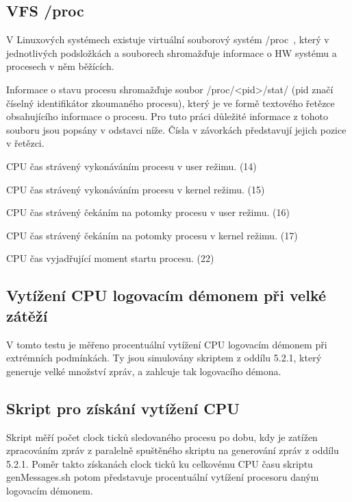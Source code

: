 \documentclass[thesis=B,czech]{FITthesis}[2012/06/26]
\begin{document}
\subsection{VFS /proc}
V Linuxových systémech existuje virtuální souborový systém /proc~\cite{procFilesystem}, který v jednotlivých podsložkách a souborech shromažďuje informace o HW systému a procesech v něm běžících.

Informace o stavu procesu shromažďuje soubor /proc/<pid>/stat/ (pid značí číselný identifikátor zkoumaného procesu), který je ve formě textového řetězce obsahujícího informace o procesu. Pro tuto práci důležité informace z tohoto souboru jsou popsány v odstavci níže. Čísla v závorkách představují jejich pozice v řetězci.

\begin{description}
\setlength\itemsep{-1ex}
	\item [utime:] CPU čas strávený vykonáváním procesu v user režimu. (14)
	\item [stime:] CPU čas strávený vykonáváním procesu v kernel režimu. (15)
	\item [cutime:] CPU čas strávený čekáním na potomky procesu v user režimu. (16)
	\item [cstime:] CPU čas strávený čekáním na potomky procesu v kernel režimu. (17)
	\item [starttime:] CPU čas vyjadřující moment startu procesu. (22)
\end{description}

\subsection{Vytížení CPU logovacím démonem při velké zátěží}
V tomto testu je měřeno procentuální vytížení CPU logovacím démonem při extrémních podmínkách. Ty jsou simulovány skriptem z oddílu 5.2.1, který generuje velké množství zpráv, a zahlcuje tak logovacího démona. 

\subsection*{Skript pro získání vytížení CPU}
Skript měří počet clock ticků sledovaného procesu po dobu, kdy je zatížen zpracováním zpráv z paralelně spuštěného skriptu na generování zpráv z oddílu 5.2.1. Poměr takto získanách clock ticků ku celkovému CPU času skriptu genMessages.sh potom představuje procentuální vytížení procesoru daným logovacím démonem.
\end{document}
